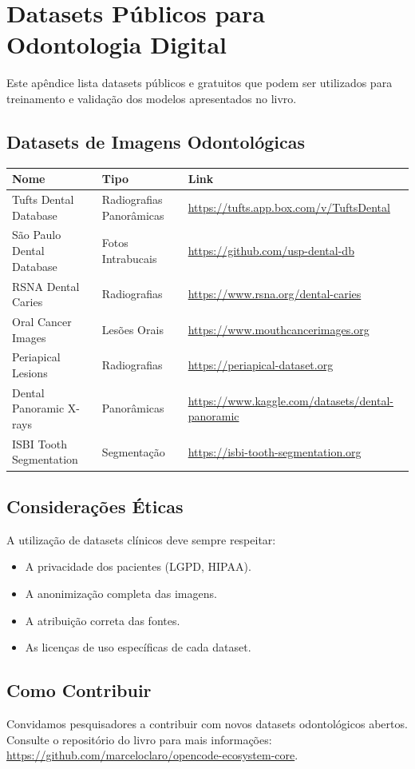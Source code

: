 \chapter{Datasets Públicos para Odontologia Digital}
\label{apendice:datasets}

Este apêndice lista datasets públicos e gratuitos que podem ser utilizados
para treinamento e validação dos modelos apresentados no livro.

\section{Datasets de Imagens Odontológicas}

\begin{longtable}{p{}p{}p{}}
  \toprule
  \textbf{Nome} & \textbf{Tipo} & \textbf{Link} \\
  \midrule
  \endhead
  Tufts Dental Database & Radiografias Panorâmicas & \url{https://tufts.app.box.com/v/TuftsDental} \\
  São Paulo Dental Database & Fotos Intrabucais & \url{https://github.com/usp-dental-db} \\
  RSNA Dental Caries & Radiografias & \url{https://www.rsna.org/dental-caries} \\
  Oral Cancer Images & Lesões Orais & \url{https://www.mouthcancerimages.org} \\
  Periapical Lesions & Radiografias & \url{https://periapical-dataset.org} \\
  Dental Panoramic X-rays & Panorâmicas & \url{https://www.kaggle.com/datasets/dental-panoramic} \\
  ISBI Tooth Segmentation & Segmentação & \url{https://isbi-tooth-segmentation.org} \\
  \bottomrule
\end{longtable}

\section{Considerações Éticas}

A utilização de datasets clínicos deve sempre respeitar:

\begin{itemize}
  \item A privacidade dos pacientes (LGPD, HIPAA).
  \item A anonimização completa das imagens.
  \item A atribuição correta das fontes.
  \item As licenças de uso específicas de cada dataset.
\end{itemize}

\section{Como Contribuir}

Convidamos pesquisadores a contribuir com novos datasets odontológicos
abertos. Consulte o repositório do livro para mais informações:
\url{https://github.com/marceloclaro/opencode-ecosystem-core}.